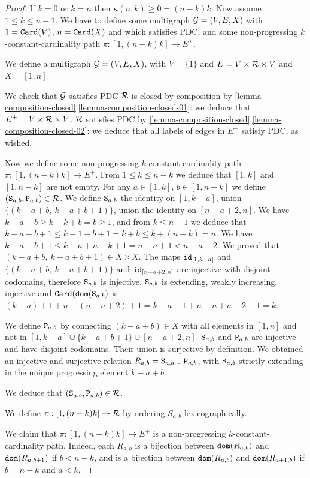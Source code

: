 \documentclass{lmcs}
\begin{document}
\begin{proof}
If $k=0$ or $k=n$ then $\kappa(n,k) \ge 0 = (n-k)k$. Now assume $1 \le k \le n-1$. 
We have to define some multigraph ${\mathcal G}=(V,E,X)$ with $1 = {\tt Card}(V)$, $n={\tt Card}(X)$
and which satisfies PDC,
and some non-progressing $k$-constant-cardinality path $\pi : [1,(n-k)k] \rightarrow E^+$.


We define a multigraph ${\mathcal G}=(V,E,X)$, with $V=\{1\}$ and 
$E = V \times {\mathcal R} \times V$ and $X = [1,n]$. 

We check that ${\mathcal G}$ satisfies PDC
${\mathcal R}$ is closed by composition 
by \ref{lemma-composition-closed}.\ref{lemma-composition-closed-01}:
we deduce that $E^+ = V \times {\mathcal R} \times V$. 
${\mathcal R}$ satisfies PDC by
\ref{lemma-composition-closed}.\ref{lemma-composition-closed-02}: 
we deduce that all labels of edges in $E^+$ satisfy PDC, as wished.

Now we define some non-progressing $k$-constant-cardinality path 
$\pi:[1,(n-k)k] \rightarrow E^+$.  From $1 \le k \le n-k$ we deduce
that $[1,k]$ and $[1,n-k]$ are not empty. For any $a \in [1,k]$, $b \in [1,n-k]$
we define $({\tt S}_{a,b},{\tt P}_{a,b}) \in {\mathcal R}$. We define ${\tt S}_{a,b}$ the identity on 
$[1,k-a] $, union $\{(k-a+b, \ k-a+b+1)\}$, union the identity on $[n-a+2,n]$. 
We have $k-a+b \ge k - k + b = b \ge 1$, and from $k \le n-1$
we deduce that $k-a+b+1 \le k - 1 + b  +1 = k + b \le k + (n-k) = n$.
We have $k-a+b+1 \le k - a + n - k +1 = n - a +1 < n-a+2$.
We proved that $(k-a+b, \ k-a+b+1) \in X \times X$. The maps
${\tt id}_{[1,k-a]}$ and $\{(k-a+b, \ k-a+b+1)\}$ and ${\tt id}_{[n-a+2,n]}$ are injective
with disjoint codomains, therefore ${\tt S}_{a,b}$ is injective. 
${\tt S}_{a,b}$ is extending, weakly increasing, injective and ${\tt Card}({\tt dom}({\tt S}_{a,b})$
is $(k-a) +1 + n-(n-a+2)+1 = k-a+1+n-n+a-2+1= k$.

We define ${\tt P}_{a,b}$ by connecting
$(k-a+b) \in X$ with all elements in $[1,n]$ and not in 
$[1,k-a] \cup \{k-a+b+1\} \cup [n-a+2,n]$. ${\tt S}_{a,b}$ and ${\tt P}_{a,b}$ are injective
and have disjoint codomains. Their union is surjective by definition.
We obtained an injective and surjective relation $R_{a,b} = {\tt S}_{a,b} \cup {\tt P}_{a,b}$,
with ${\tt S}_{a,b}$ strictly extending in the unique progressing element $k-a+b$. 


We deduce that $({\tt S}_{a,b},{\tt P}_{a,b}) \in {\mathcal R}$. 

We define $\pi:[1,(n-k)k] 
\rightarrow {\mathcal R}$ by ordering $S_{a,b}$ lexicographically.

We claim that
$\pi:[1,(n-k)k] \rightarrow E^+$ is a non-progressing $k$-constant-cardinality path.
Indeed, each $R_{a,b}$ is a bijection between ${\tt dom}(R_{a,b})$ and 
${\tt dom}(R_{a,b+1})$ if $b<n-k$, and is a bijection between ${\tt dom}(R_{a,b})$ and 
${\tt dom}(R_{a+1,b})$ if $b=n-k$ and $a<k$.
\end{proof}
\end{document}
